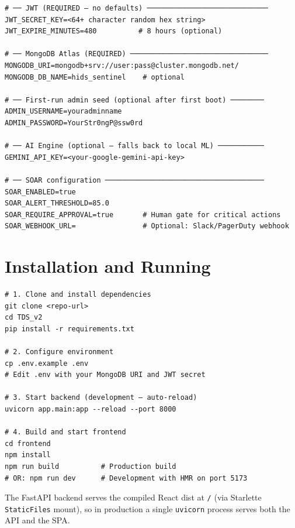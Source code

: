 \documentclass[12pt,a4paper]{article}
\begin{document}
\begin{lstlisting}[style=bash, caption={Required environment variables (.env)}]
# ── JWT (REQUIRED — no defaults) ─────────────────────────────
JWT_SECRET_KEY=<64+ character random hex string>
JWT_EXPIRE_MINUTES=480          # 8 hours (optional)

# ── MongoDB Atlas (REQUIRED) ─────────────────────────────────
MONGODB_URI=mongodb+srv://user:pass@cluster.mongodb.net/
MONGODB_DB_NAME=hids_sentinel    # optional

# ── First-run admin seed (optional after first boot) ────────
ADMIN_USERNAME=youradminname
ADMIN_PASSWORD=YourStr0ngP@ssw0rd

# ── AI Engine (optional — falls back to local ML) ───────────
GEMINI_API_KEY=<your-google-gemini-api-key>

# ── SOAR configuration ──────────────────────────────────────
SOAR_ENABLED=true
SOAR_ALERT_THRESHOLD=85.0
SOAR_REQUIRE_APPROVAL=true       # Human gate for critical actions
SOAR_WEBHOOK_URL=                # Optional: Slack/PagerDuty webhook
\end{lstlisting}

\section{Installation and Running}

\begin{lstlisting}[style=bash, caption={Backend setup and startup}]
# 1. Clone and install dependencies
git clone <repo-url>
cd TDS_v2
pip install -r requirements.txt

# 2. Configure environment
cp .env.example .env
# Edit .env with your MongoDB URI and JWT secret

# 3. Start backend (development — auto-reload)
uvicorn app.main:app --reload --port 8000

# 4. Build and start frontend
cd frontend
npm install
npm run build          # Production build
# OR: npm run dev      # Development with HMR on port 5173
\end{lstlisting}

The FastAPI backend serves the compiled React dist at \texttt{/}
(via Starlette \texttt{StaticFiles} mount), so in production a
single \texttt{uvicorn} process serves both the API and the SPA.

\end{document}

